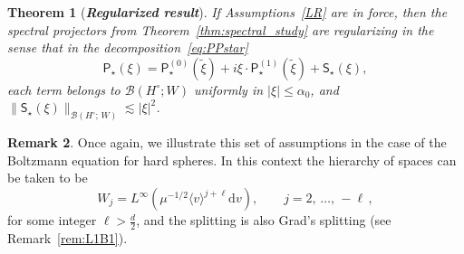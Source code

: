 \documentclass[10pt]{amsart}
\newtheorem{theo}{Theorem}[section]
\theoremstyle{definition}\newtheorem{defi}[theo]{Definition}\newtheorem{rema}[theo]{Remark}\newtheorem{exam}[theo]{Example}\newtheorem{exem}[theo]{Example}\newtheorem{nota}[theo]{Notation}
\renewcommand{\d}{\mathrm{d}}
\newcommand{\sfS}{\mathsf{S}}
\newcommand{\PP}{\mathsf{P}}
\newcommand{\BBB}{\mathscr{B}}
\newcommand{\Ssm}{H^{\circ}}
\newcommand{\Sr}{W}
\renewcommand*\le{\leqslant}
\newcommand{\la}{\langle}
\newcommand{\ra}{\rangle}
\begin{document}
\begin{theo}[\emph{\textbf{Regularized result}}]\label{thm:regularized_thm}
If Assumptions~\eqref{LR} are in force, then the spectral projectors from Theorem~\ref{thm:spectral_study} are regularizing in the sense that in the decomposition~\eqref{eq:PPstar}
\begin{equation*}
\PP_\star(\xi) = \PP^{(0)}_\star\left(\widetilde{\xi} \right) + i \xi \cdot \PP_\star^{(1)}\left(\widetilde{\xi} \right) + \sfS_{\star}(\xi),
\end{equation*}
each term belongs to $\BBB(\Ssm ; \Sr )$ uniformly in $|\xi| \le \alpha_{0}$, and $\| \sfS_\star(\xi) \|_{ \BBB(\Ssm;\,\Sr) } \lesssim | \xi |^2$.
\end{theo}

\begin{rema}
Once again, we illustrate this set of assumptions in the case of the Boltzmann equation for hard spheres. In this context the hierarchy of spaces can be taken to be
\[
\Sr_j = L^\infty\left(\mu^{-1/2} \la v \ra^{j + \ell} \d v \right), \qquad j=2,\,\ldots,\,-\ell\,,
\]
for some integer $\ell > \frac{d}{2}$, and the splitting is also Grad's splitting (see Remark~\ref{rem:L1B1}).
\end{rema}
\end{document}
